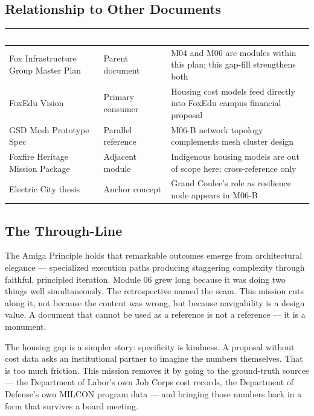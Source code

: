 \documentclass[11pt,letterpaper]{article}
\newcommand{\tableheader}[1]{\textbf{\sffamily\textcolor{white}{#1}}}
\begin{document}
\subsection{Relationship to Other Documents}

\begin{center}
\begin{tabularx}{\textwidth}{L{4cm}L{4cm}X}
\toprule
{}
\tableheader{Document} & \tableheader{Relationship} & \tableheader{Integration Point} \\
\midrule
Fox Infrastructure Group Master Plan & Parent document & M04 and M06 are modules within this plan; this gap-fill strengthens both \\
FoxEdu Vision & Primary consumer & Housing cost models feed directly into FoxEdu campus financial proposal \\
GSD Mesh Prototype Spec & Parallel reference & M06-B network topology complements mesh cluster design \\
Foxfire Heritage Mission Package & Adjacent module & Indigenous housing models are out of scope here; cross-reference only \\
Electric City thesis & Anchor concept & Grand Coulee's role as resilience node appears in M06-B \\
\bottomrule
\end{tabularx}
\end{center}

\subsection{The Through-Line}

The Amiga Principle holds that remarkable outcomes emerge from architectural elegance --- specialized execution paths producing staggering complexity through faithful, principled iteration. Module 06 grew long because it was doing two things well simultaneously. The retrospective named the seam. This mission cuts along it, not because the content was wrong, but because navigability is a design value. A document that cannot be used as a reference is not a reference --- it is a monument.

The housing gap is a simpler story: specificity is kindness. A proposal without cost data asks an institutional partner to imagine the numbers themselves. That is too much friction. This mission removes it by going to the ground-truth sources --- the Department of Labor's own Job Corps cost records, the Department of Defense's own MILCON program data --- and bringing those numbers back in a form that survives a board meeting.
\end{document}
